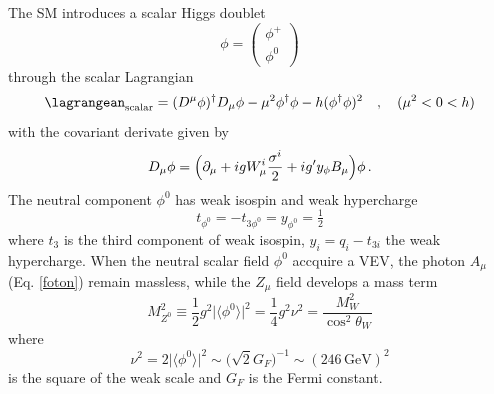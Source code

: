 The SM introduces a scalar Higgs doublet 
\begin{equation}
\phi=\left(\begin{array}{c} \phi^+\\ \phi^0 \end{array} \right)
\end{equation}
through the scalar Lagrangian
\begin{equation}
\lagrangean_{\text{scalar}}=(D^\mu\phi)^\dagger D_\mu\phi - \mu^2\phi^\dagger\phi - h(\phi^\dagger\phi)^2\quad , \quad (\mu^2 < 0 < h)
\end{equation}  
with the covariant derivate given by
\begin{equation}
D_\mu\phi =\Bigl(\partial_\mu+igW_\mu^i \frac{\sigma^i}{2} + ig'y_\phi B_\mu \Bigr)\phi\,. \label{covder}
\end{equation}
The neutral component $\phi^0$ has weak isospin and weak hypercharge  
\begin{equation}
t_{\phi^0}=-t_{3\phi^0}=y_{\phi^0}=\tfrac{1}{2}
\end{equation}
where $t_3$ is the third component of weak isospin, $y_i=q_i-t_{3i}$ the weak hypercharge.
When the neutral scalar field $\phi^0$ accquire a VEV, the photon $A_\mu$ (Eq. \ref{foton}) remain massless, while the $Z_\mu$ field develops a mass term
\begin{equation}
M_{Z^0}^2\equiv \frac{1}{2}g^2\bigl|\langle\phi^0\rangle\bigr|^2 = \frac{1}{4}g^2\nu^2 = \frac{M_W^2}{\cos^2\theta_W} \label{ZmassSM}
\end{equation}
where 
\begin{equation}
\nu^2=2\bigl|\langle\phi^0\rangle\bigr|^2 \sim \bigl(\sqrt{2}G_F\bigr)^{-1} \sim (246\,\text{GeV})^2
\end{equation}
is the square of the weak scale and $G_F$ is the Fermi constant. 

